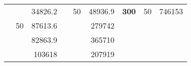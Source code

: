 \begin{table}[H]
\begin{tabular}{|ccrccrccc}
\rowcolor[HTML]{DDFDFF} 
\multicolumn{1}{|c|}{\cellcolor[HTML]{FFFFC7}}                                & \multicolumn{1}{c|}{\cellcolor[HTML]{DDFDFF}}                      & \multicolumn{1}{r|}{\cellcolor[HTML]{DAE8FC}34826.2}   & \multicolumn{1}{c|}{\cellcolor[HTML]{FFFFC7}}                                & \multicolumn{1}{c|}{\multirow{-10}{*}{\cellcolor[HTML]{DDFDFF}50}}  & \multicolumn{1}{r|}{\cellcolor[HTML]{DDFDFF}48936.9}   & \multicolumn{1}{c|}{\multirow{-19}{*}{\cellcolor[HTML]{FFFFC7}\textbf{300}}} & \multicolumn{1}{c|}{\multirow{-10}{*}{\cellcolor[HTML]{DDFDFF}50}} & \multicolumn{1}{r|}{\cellcolor[HTML]{DDFDFF}746153}    \\ \cline{3-3} \cline{5-9} 
\multicolumn{1}{|c|}{\cellcolor[HTML]{FFFFC7}}                                & \multicolumn{1}{c|}{\multirow{-10}{*}{\cellcolor[HTML]{DDFDFF}50}} & \multicolumn{1}{r|}{\cellcolor[HTML]{DDFDFF}87613.6}   & \multicolumn{1}{c|}{\cellcolor[HTML]{FFFFC7}}                                & \multicolumn{1}{c|}{\cellcolor[HTML]{DAE8FC}}                       & \multicolumn{1}{r|}{\cellcolor[HTML]{DAE8FC}279742}    &                                                                              &                                                                    &                                                        \\ \cline{2-3} \cline{6-6}
\multicolumn{1}{|c|}{\cellcolor[HTML]{FFFFC7}}                                & \multicolumn{1}{c|}{\cellcolor[HTML]{DAE8FC}}                      & \multicolumn{1}{r|}{\cellcolor[HTML]{DAE8FC}82863.9}   & \multicolumn{1}{c|}{\cellcolor[HTML]{FFFFC7}}                                & \multicolumn{1}{c|}{\cellcolor[HTML]{DAE8FC}}                       & \multicolumn{1}{r|}{\cellcolor[HTML]{DDFDFF}365710}    &                                                                              &                                                                    &                                                        \\ \cline{3-3} \cline{6-6}
\multicolumn{1}{|c|}{\cellcolor[HTML]{FFFFC7}}                                & \multicolumn{1}{c|}{\cellcolor[HTML]{DAE8FC}}                      & \multicolumn{1}{r|}{\cellcolor[HTML]{DDFDFF}103618}    & \multicolumn{1}{c|}{\cellcolor[HTML]{FFFFC7}}                                & \multicolumn{1}{c|}{\cellcolor[HTML]{DAE8FC}}                       & \multicolumn{1}{r|}{\cellcolor[HTML]{DAE8FC}207919}    &                                                                              &                                                                    &                                                        \\ \cline{3-3} \cline{6-6}

\end{tabular}
\end{table}
